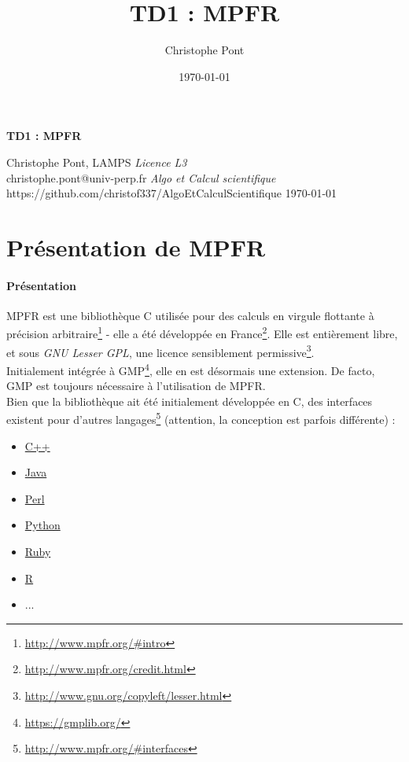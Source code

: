 \documentclass[a4paper,11pt]{exam}
\begin{document}
\title{\large TD1 : MPFR}
\author{Christophe Pont}
\date{\today{}} %

\lstset{
	language=C, 
	breakatwhitespace=false,
	breaklines=true, 
	showspaces=false
	showstringspaces=false,          %
  showtabs=false                  %
} 

\centering
{\huge\bfseries TD1 : MPFR\par}
\begin{flushleft}
{Christophe Pont, LAMPS \hfill \emph{Licence L3}\\ 
christophe.pont@univ-perp.fr \hfill \emph{Algo et Calcul scientifique} \\ 
https://github.com/christof337/AlgoEtCalculScientifique \hfill \today} \\ 
\end{flushleft}

\justifying
\section{Présentation de MPFR}
\paragraph{Présentation}
MPFR est une bibliothèque C utilisée pour des calculs en virgule flottante à précision arbitraire\footnote{\url{http://www.mpfr.org/\#intro}} - elle a été développée en France\footnote{\url{http://www.mpfr.org/credit.html}}. 
Elle est entièrement libre, et sous \emph{GNU Lesser GPL}, une licence sensiblement permissive\footnote{\url{http://www.gnu.org/copyleft/lesser.html}}.\\
Initialement intégrée à GMP\footnote{\url{https://gmplib.org/}}, elle en est désormais une extension. De facto, GMP est toujours nécessaire à l'utilisation de MPFR. \\
Bien que la bibliothèque ait été initialement développée en C, des interfaces existent pour d'autres langages\footnote{\url{http://www.mpfr.org/\#interfaces}} (attention, la conception est parfois différente) :
	\begin{itemize}
		\item \href{http://www.mpfr.org/\#interfaces}{C++}
		\item \href{https://github.com/kframework/mpfr-java}{Java}
		\item \href{http://search.cpan.org/~sisyphus/Math-MPFR/}{Perl}
		\item \href{https://pypi.python.org/pypi/gmpy2}{Python}
		\item \href{http://rubygems.org/gems/gmp}{Ruby}
		\item \href{https://cran.r-project.org/web/packages/Rmpfr/index.html}{R}
		\item ...
	\end{itemize}
\end{document}
